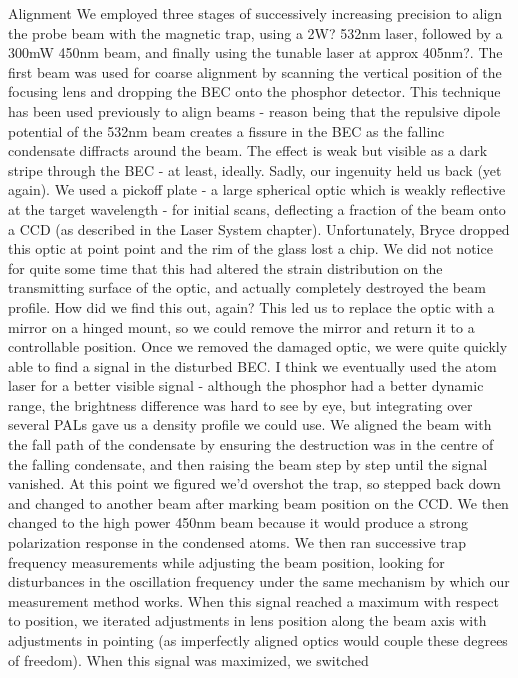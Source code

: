 Alignment We employed three stages of successively increasing precision
to align the probe beam with the magnetic trap, using a 2W? 532nm laser,
followed by a 300mW 450nm beam, and finally using the tunable laser at
approx 405nm?. The first beam was used for coarse alignment by scanning
the vertical position of the focusing lens and dropping the BEC onto the
phosphor detector. This technique has been used previously to align
beams - reason being that the repulsive dipole potential of the 532nm
beam creates a fissure in the BEC as the fallinc condensate diffracts
around the beam. The effect is weak but visible as a dark stripe through
the BEC - at least, ideally. Sadly, our ingenuity held us back (yet
again). We used a pickoff plate - a large spherical optic which is
weakly reflective at the target wavelength - for initial scans,
deflecting a fraction of the beam onto a CCD (as described in the Laser
System chapter). Unfortunately, Bryce dropped this optic at point point
and the rim of the glass lost a chip. We did not notice for quite some
time that this had altered the strain distribution on the transmitting
surface of the optic, and actually completely destroyed the beam
profile. How did we find this out, again? This led us to replace the
optic with a mirror on a hinged mount, so we could remove the mirror and
return it to a controllable position. Once we removed the damaged optic,
we were quite quickly able to find a signal in the disturbed BEC. I
think we eventually used the atom laser for a better visible signal -
although the phosphor had a better dynamic range, the brightness
difference was hard to see by eye, but integrating over several PALs
gave us a density profile we could use. We aligned the beam with the
fall path of the condensate by ensuring the destruction was in the
centre of the falling condensate, and then raising the beam step by step
until the signal vanished. At this point we figured we'd overshot the
trap, so stepped back down and changed to another beam after marking
beam position on the CCD. We then changed to the high power 450nm beam
because it would produce a strong polarization response in the condensed
atoms. We then ran successive trap frequency measurements while
adjusting the beam position, looking for disturbances in the oscillation
frequency under the same mechanism by which our measurement method
works. When this signal reached a maximum with respect to position, we
iterated adjustments in lens position along the beam axis with
adjustments in pointing (as imperfectly aligned optics would couple
these degrees of freedom). When this signal was maximized, we switched
